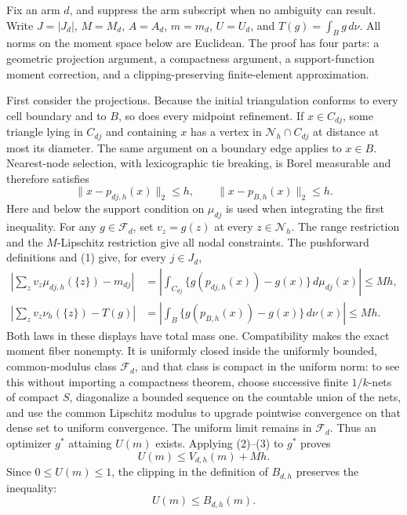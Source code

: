 Fix an arm \(d\), and suppress the arm subscript when no ambiguity can
result.  Write \(J=|J_d|\), \(M=M_d\), \(A=A_d\), \(m=m_d\),
\(U=U_d\), and \(T(g)=\int_B g\,d\nu\).  All norms on the moment
space below are Euclidean.  The proof has four parts: a geometric projection
argument, a compactness argument, a support-function moment correction, and a
clipping-preserving finite-element approximation.

First consider the projections.  Because the initial triangulation conforms to
every cell boundary and to \(B\), so does every midpoint refinement.  If
\(x\in C_{dj}\), some triangle lying in \(C_{dj}\) and containing \(x\) has a
vertex in \(\mathcal N_h\cap C_{dj}\) at distance at most its diameter.  The
same argument on a boundary edge applies to \(x\in B\).  Nearest-node
selection, with lexicographic tie breaking, is Borel measurable and therefore
satisfies
\[
 \|x-p_{dj,h}(x)\|_2\le h,
 \qquad
 \|x-p_{B,h}(x)\|_2\le h.                                      \tag{1}
\]
Here and below the support condition on \(\mu_{dj}\) is used when integrating
the first inequality.  For any \(g\in\mathcal F_d\), set
\(v_z=g(z)\) at every \(z\in\mathcal N_h\).  The range restriction and the
\(M\)-Lipschitz restriction give all nodal constraints.  The pushforward
definitions and (1) give, for every \(j\in J_d\),
\begin{align}
 \left|\sum_z v_z\mu_{dj,h}(\{z\})-m_{dj}\right|
 &=\left|\int_{C_{dj}}\{g(p_{dj,h}(x))-g(x)\}\,d\mu_{dj}(x)\right|
 \le Mh,                                                       \tag{2}\\
 \left|\sum_z v_z\nu_h(\{z\})-T(g)\right|
 &=\left|\int_B\{g(p_{B,h}(x))-g(x)\}\,d\nu(x)\right|
 \le Mh.                                                       \tag{3}
\end{align}
Both laws in these displays have total mass one.  Compatibility makes the
exact moment fiber nonempty.  It is uniformly closed inside the uniformly
bounded, common-modulus class \(\mathcal F_d\), and that class is compact in
the uniform norm: to see this without importing a compactness theorem, choose
successive finite \(1/k\)-nets of compact \(S\), diagonalize a bounded sequence
on the countable union of the nets, and use the common Lipschitz modulus to
upgrade pointwise convergence on that dense set to uniform convergence.  The
uniform limit remains in \(\mathcal F_d\).  Thus an optimizer \(g^*\) attaining
\(U(m)\) exists.  Applying (2)--(3) to \(g^*\) proves
\[
 U(m)\le V_{d,h}(m)+Mh.
\]
Since \(0\le U(m)\le1\), the clipping in the definition of \(B_{d,h}\)
preserves the inequality:
\[
 U(m)\le B_{d,h}(m).                                         \tag{4}
\]

